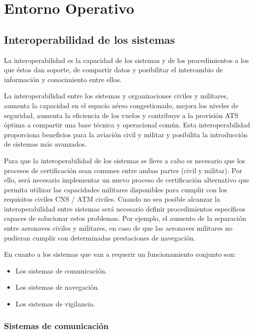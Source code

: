 \section{Entorno Operativo}

\subsection{Interoperabilidad de los sistemas }

La interoperabilidad es la capacidad de los sistemas y de los procedimientos a los que éstos dan soporte, de compartir datos y posibilitar el intercambio de información y conocimiento entre ellos. 

La interoperabilidad entre los sistemas y organizaciones civiles y militares, aumenta la capacidad en el espacio aéreo congestionado, mejora los niveles de seguridad, aumenta la eficiencia de los vuelos y contribuye a la provisión ATS óptima a compartir una base técnica y operacional común. Esta interoperabilidad proporciona beneficios para la aviación civil y militar y posibilita la introducción de sistemas más avanzados.

Para que la interoperabilidad de los sistemas se lleve a cabo es necesario que los procesos de certificación sean comunes entre ambas partes (civil y militar). Por ello, será necesario implementar un nuevo proceso de certificación alternativo que permita utilizar las capacidades militares disponibles para cumplir con los requisitos civiles CNS / ATM civiles. Cuando no sea posible alcanzar la interoperabilidad entre sistemas será necesario definir procedimientos específicos capaces de solucionar estos problemas. Por ejemplo, el aumento de la separación entre aeronaves civiles y militares, en caso de que las aeronaves militares no pudieran cumplir con determinadas prestaciones de navegación.

En cuanto a los sistemas que van a requerir un funcionamiento conjunto son: 

\begin{itemize}
    \item Los sistemas de comunicación.
    \item Los sistemas de navegación.
    \item Los sistemas de vigilancia.
\end{itemize}

\subsubsection{Sistemas de comunicación}

